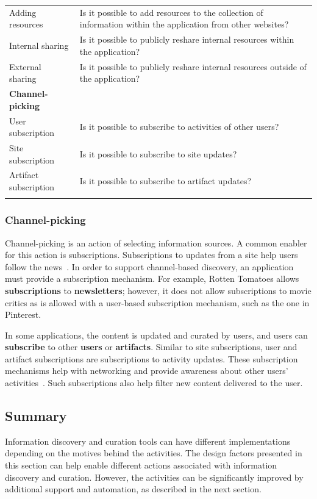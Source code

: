 \documentclass{sigchi}
\begin{document}
{{\begin{table}[ht!]
\begin{tabular}{|p{}|  p{}|}
Adding resources        & Is it possible to add resources to the collection of information within the application from other websites? \\
Internal sharing        & Is it possible to publicly reshare internal resources within the application? \\ 
External sharing        & Is it possible to publicly reshare internal resources outside of the application? \\ 
\textbf{Channel-picking}  	& \\
User subscription       & Is it possible to subscribe to activities of other users? \\
Site subscription       & Is it possible to subscribe to site updates? \\
Artifact subscription  	& Is it possible to subscribe to artifact updates?\\
& \\
\hline        
\end{tabular}
\end{table}

{\subsubsection{Channel-picking}

Channel-picking is an action of selecting information sources. A common enabler for this action is subscriptions. Subscriptions to updates from a site help users follow the news~\cite{java2007feeds}. In order to support channel-based discovery, an application must provide a subscription mechanism. For example, Rotten Tomatoes allows \textbf{subscriptions} to \textbf{newsletters}; however, it does not allow subscriptions to movie critics as is allowed with a user-based subscription mechanism, such as the one in Pinterest. 

In some applications, the content is updated and curated by users, and users can \textbf{subscribe} to other \textbf{users} or \textbf{artifacts}. Similar to site subscriptions, user and artifact subscriptions are subscriptions to activity updates. These subscription mechanisms help with networking and provide awareness about other users' activities~\cite{millen2005social}. Such subscriptions also help filter new content delivered to the user. 
} %
} %

{\subsection{Summary}
Information discovery and curation tools can have different implementations depending on the motives behind the activities. The design factors presented in this section can help enable different actions associated with information discovery and curation. However, the activities can be significantly improved by additional support and automation, as described in the next section.
}
} %
\end{document}
